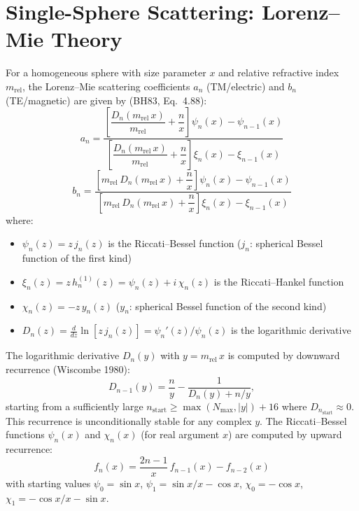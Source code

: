 \documentclass[11pt,a4paper]{article}
\begin{document}
\section{Single-Sphere Scattering: Lorenz--Mie Theory}
\label{sec:mie}

For a homogeneous sphere with size parameter $x$ and relative refractive index $m_\mathrm{rel}$, the Lorenz--Mie scattering coefficients $a_n$ (TM/electric) and $b_n$ (TE/magnetic) are given by (BH83, Eq.~4.88):
\begin{equation}
  a_n = \frac{\left[\dfrac{D_n(m_\mathrm{rel}\,x)}{m_\mathrm{rel}} + \dfrac{n}{x}\right] \psi_n(x) - \psi_{n-1}(x)}
             {\left[\dfrac{D_n(m_\mathrm{rel}\,x)}{m_\mathrm{rel}} + \dfrac{n}{x}\right] \xi_n(x) - \xi_{n-1}(x)}
  \label{eq:mie-an}
\end{equation}
\begin{equation}
  b_n = \frac{\left[m_\mathrm{rel}\,D_n(m_\mathrm{rel}\,x) + \dfrac{n}{x}\right] \psi_n(x) - \psi_{n-1}(x)}
             {\left[m_\mathrm{rel}\,D_n(m_\mathrm{rel}\,x) + \dfrac{n}{x}\right] \xi_n(x) - \xi_{n-1}(x)}
  \label{eq:mie-bn}
\end{equation}
where:
\begin{itemize}[nosep]
  \item $\psi_n(z) = z\,j_n(z)$ is the Riccati--Bessel function ($j_n$: spherical Bessel function of the first kind)
  \item $\xi_n(z) = z\,h_n^{(1)}(z) = \psi_n(z) + i\,\chi_n(z)$ is the Riccati--Hankel function
  \item $\chi_n(z) = -z\,y_n(z)$ ($y_n$: spherical Bessel function of the second kind)
  \item $D_n(z) = \frac{d}{dz}\ln[z\,j_n(z)] = \psi_n'(z)/\psi_n(z)$ is the logarithmic derivative
\end{itemize}

The logarithmic derivative $D_n(y)$ with $y = m_\mathrm{rel}\,x$ is computed by downward recurrence (Wiscombe 1980):
\begin{equation}
  D_{n-1}(y) = \frac{n}{y} - \frac{1}{D_n(y) + n/y},
  \label{eq:dn-recurrence}
\end{equation}
starting from a sufficiently large $n_\mathrm{start} \geq \max(N_\mathrm{max}, |y|) + 16$ where $D_{n_\mathrm{start}} \approx 0$.
This recurrence is unconditionally stable for any complex $y$.
The Riccati--Bessel functions $\psi_n(x)$ and $\chi_n(x)$ (for real argument $x$) are computed by upward recurrence:
\begin{equation}
  f_n(x) = \frac{2n - 1}{x}\,f_{n-1}(x) - f_{n-2}(x)
  \label{eq:bessel-recurrence}
\end{equation}
with starting values $\psi_0 = \sin x$, $\psi_1 = \sin x / x - \cos x$, $\chi_0 = -\cos x$, $\chi_1 = -\cos x / x - \sin x$.
\end{document}
